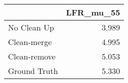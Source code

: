 \begin{tabular}{lr}
\toprule
{} & LFR_mu_55 \\
\midrule
No Clean Up  &     3.989 \\
Clean-merge  &     4.995 \\
Clean-remove &     5.053 \\
Ground Truth &     5.330 \\
\bottomrule
\end{tabular}
